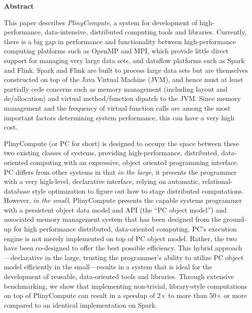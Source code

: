 
\noindent
\textbf{Abstract}

\noindent
This paper describes \emph{PlinyCompute}, a system for development of
high-performance, data-intensive, distributed computing tools and libraries.
Currently, there is a big gap in performance and functionality between 
high-performance computing platforms such as OpenMP and MPI, which provide little direct support for
managing very large data sets, and dataflow platforms such as Spark and Flink.  Spark and Flink
are built to process large data sets but are themselves constructed on top of the
Java Virtual Machine (JVM), and hence must
at least partially cede concerns such as 
memory management (including layout and de/allocation) and virtual method/function dipatch to the JVM. Since memory management 
and the frequency of virtual function calls are
among the most important factors determining system performance,
this can have a very high cost.

PlinyCompute (or PC for short) is designed to occupy the space between these two 
existing classes of systems, providing high-performance, distributed, data-oriented computing with an expressive,
object oriented programming interface.
PC differs from other systems in that \emph{in the large}, it presents the programmer with a very high-level,
declarative interface, relying on automatic, relational-database style optimization to figure out how to stage
distributed computations.  However, \emph{in the small}, PlinyCompute presents the capable systems programmer with a
persistent object data model and API (the ``PC object model'') and associated memory management system
that has been designed from the ground-up for
high performance distributed, data-oriented computing.
PC's execution engine is not merely implemented on top of
PC object model.  Rather, the two have been co-designed to offer the best possible efficiency.
This hybrid approach---declarative in the large, trusting the programmer's ability
to utilize PC object model efficiently
in the small---results in a system that is ideal for the development of reusable, data-oriented tools and libraries.
Through extensive benchmarking, we show that implementing non-trivial, library-style computations 
on top of PlinyCompute can result in a speedup of 2$\times$ to
more than 
50$\times$ or more compared to an identical implementation on Spark.
